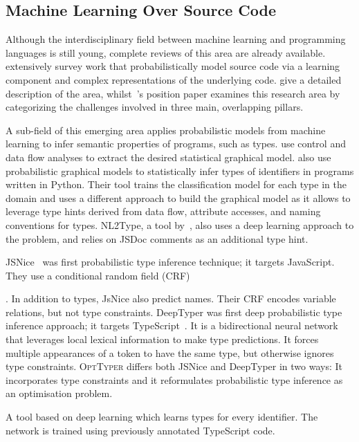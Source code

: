\documentclass[acmsmall, review, anonymous]{acmart}\settopmatter{printfolios=true,printccs=false,printacmref=false}
\newcommand{\projectname}{\textsc{OptTyper}\xspace}
\newcommand{\margincomment}[2]{\marginpar{\scriptsize\color{Maroon}#1 says: #2}}
\newcommand{\ivp}[1]{\margincomment{IVP}{#1}}
\begin{document}
\subsection{Machine Learning Over Source Code}\label{sec:ml:over:source}

Although the interdisciplinary field between machine learning and programming
languages is still young, complete reviews of this area are
already available.
%
\citet{allamanis17} extensively survey
work that probabilistically model source code via
a learning component and complex representations of the underlying
code.
%
\citet{vechev16} give
a detailed description of the area, whilst~\citet{threepillars}'s
position paper examines this research area by categorizing
the challenges involved in three main, overlapping pillars.

A sub-field of this
emerging area applies probabilistic models from machine learning to infer semantic
properties of programs, such as types.
%
\citet{chibotaru19} use control and data flow analyses to extract
the desired statistical graphical model.
%
\citet{xu16} also use probabilistic graphical models to statistically infer
types of identifiers in programs written in Python. Their tool trains the
classification model for each type in the domain and uses a different
approach to build the graphical model as it allows to leverage type hints
derived from data flow, attribute accesses, and naming conventions for types. NL2Type, a tool by~\cite{malik19}, also uses
a deep learning approach to the problem, and  relies on JSDoc comments as
an additional type hint.

JSNice~\citep{raychev15} was first probabilistic type inference technique;  it targets JavaScript.  They use a conditional random field (CRF)~\cite{sutton12}

\ivp{define this.}.  In addition to types, JsNice also predict names.
Their CRF encodes variable relations, but not type constraints.
DeepTyper was first deep probabilistic type inference approach; it targets TypeScript~\cite{hellendoorn18}.  It is a bidirectional neural network that leverages local lexical information to make type predictions. It forces multiple appearances of a token to have the same type, but otherwise ignores type constraints.  \projectname differs both JSNice and DeepTyper in two ways:  It incorporates type constraints and it reformulates probabilistic type inference as an optimisation problem.


A tool based on deep learning which learns types for every identifier.
The network is trained using previously annotated TypeScript code.
	      
\end{document}
